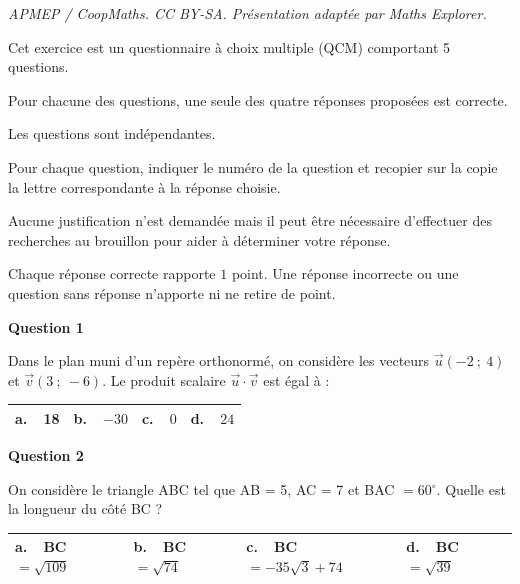 \documentclass[10pt]{article}
\providecommand{\degres}{\ensuremath{^\circ}}
\providecommand{\vect}[1]{\overrightarrow{#1}}
\providecommand{\degres}{{^\circ}}
\begin{document}
\noindent\textit{APMEP / CoopMaths. CC BY-SA. Présentation adaptée par Maths Explorer.}\par\medskip
\medskip

Cet exercice est un questionnaire à choix multiple (QCM) comportant 5 questions.

Pour chacune des questions, une seule des quatre réponses proposées est correcte.

Les questions sont indépendantes.

Pour chaque question, indiquer le numéro de la question et recopier sur la copie la lettre correspondante à la réponse choisie.

Aucune justification n'est demandée mais il peut être nécessaire d'effectuer des recherches au brouillon pour aider à déterminer votre réponse.

Chaque réponse correcte rapporte $1$ point. Une réponse incorrecte ou une question sans réponse n'apporte ni ne retire de point.

\medskip

\textbf{Question 1}

\medskip

Dans le plan muni d'un repère orthonormé, on considère les vecteurs $\vect{u}(-2~;~4)$ et $\vect{v}(3~;~-6)$. Le produit scalaire $\vect{u} \cdot \vect{v}$ est égal à :

\begin{center}
\begin{tabularx}{\linewidth}{|*{4}{X|}}\hline
\textbf{a.~~}18&\textbf{b.~~}$-30$&\textbf{c.~~}$0$&\textbf{d.~~}$24$\\ \hline
\end{tabularx}
\end{center}

\medskip

\textbf{Question 2}

\medskip

On considère le triangle ABC tel que AB = 5, AC = 7 et BAC $= 60\degres$. Quelle est la longueur du côté BC ?

\begin{center}
\begin{tabularx}{\linewidth}{|*{4}{X|}}\hline
\textbf{a.~~}BC$ = \sqrt{109}$ &\textbf{b.~~}BC$ = \sqrt{74}$&\textbf{c.~~}BC$= -35\sqrt{3} + 74$  &\textbf{d.~~}BC$= \sqrt{39}$\\ \hline
\end{tabularx}
\end{center}

\medskip
\end{document}
